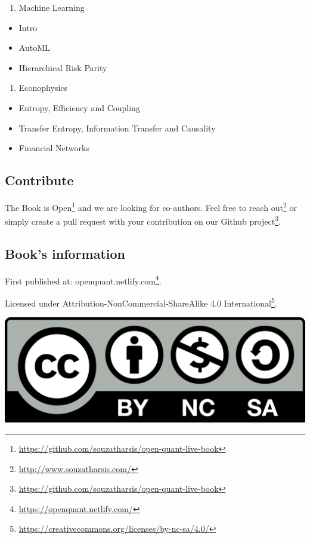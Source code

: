\documentclass[]{book}
\DeclareRobustCommand{\href}[2]{#2\footnote{\url{#1}}}
\providecommand{\tightlist}{%
  \setlength{\itemsep}{0pt}\setlength{\parskip}{0pt}}
\begin{document}
\begin{enumerate}
\def\labelenumi{\arabic{enumi}.}
\setcounter{enumi}{3}
\tightlist
\item
  Machine Learning
\end{enumerate}

\begin{itemize}
\tightlist
\item
  Intro
\item
  AutoML
\item
  Hierarchical Risk Parity
\end{itemize}

\begin{enumerate}
\def\labelenumi{\arabic{enumi}.}
\setcounter{enumi}{4}
\tightlist
\item
  Econophysics
\end{enumerate}

\begin{itemize}
\tightlist
\item
  Entropy, Efficiency and Coupling
\item
  Transfer Entropy, Information Transfer and Causality
\item
  Financial Networks
\end{itemize}

\subsection*{Contribute}\label{contribute}

The Book is
\href{https://github.com/souzatharsis/open-quant-live-book}{Open} and we
are looking for co-authors. Feel free to
\href{http://www.souzatharsis.com/}{reach out} or simply create a pull
request with your contribution on our
\href{https://github.com/souzatharsis/open-quant-live-book}{Github
project}.

\subsection*{Book's information}\label{books-information}

First published at:
\href{https://openquant.netlify.com/}{openquant.netlify.com}.

Licensed under
\href{https://creativecommons.org/licenses/by-nc-sa/4.0/}{Attribution-NonCommercial-ShareAlike
4.0 International}.

\includegraphics[width=0.2\linewidth]{fig/by-nc-sa}
\end{document}
